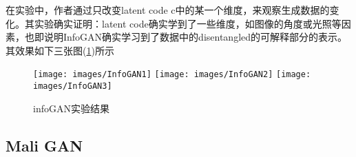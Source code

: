             \par
            在实验中，作者通过只改变latent code c中的某一个维度，来观察生成数据的变化。其实验确实证明：latent code确实学到了一些维度，如图像的角度或光照等因素，也即说明InfoGAN确实学习到了数据中的disentangled的可解释部分的表示。其效果如下三张图(\ref{fig:infoGAN实验结果})所示
                \begin{figure}[H]
                \centering
                \texttt{[image: images/InfoGAN1]}
                \qquad
                \texttt{[image: images/InfoGAN2]}
                \qquad
                \texttt{[image: images/InfoGAN3]}
                \caption{infoGAN实验结果}
                \label{fig:infoGAN实验结果}
                \end{figure}

    \subsection{Mali GAN}

